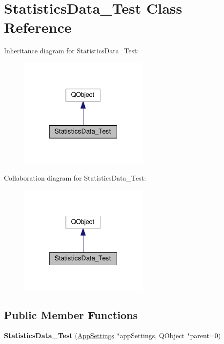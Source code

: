 \hypertarget{class_statistics_data___test}{}\section{Statistics\+Data\+\_\+\+Test Class Reference}
\label{class_statistics_data___test}


Inheritance diagram for Statistics\+Data\+\_\+\+Test\+:
\nopagebreak
\begin{figure}[H]
\begin{center}
\leavevmode
\includegraphics[width=184pt]{class_statistics_data___test__inherit__graph}
\end{center}
\end{figure}


Collaboration diagram for Statistics\+Data\+\_\+\+Test\+:
\nopagebreak
\begin{figure}[H]
\begin{center}
\leavevmode
\includegraphics[width=184pt]{class_statistics_data___test__coll__graph}
\end{center}
\end{figure}
\subsection*{Public Member Functions}
\begin{DoxyCompactItemize}
\item 
{\bfseries Statistics\+Data\+\_\+\+Test} (\hyperlink{class_app_settings}{App\+Settings} $\ast$app\+Settings, Q\+Object $\ast$parent=0)\hypertarget{class_statistics_data___test_a9fcd18f28c933278ebcd4201f589670e}{}\label{class_statistics_data___test_a9fcd18f28c933278ebcd4201f589670e}

\end{DoxyCompactItemize}
